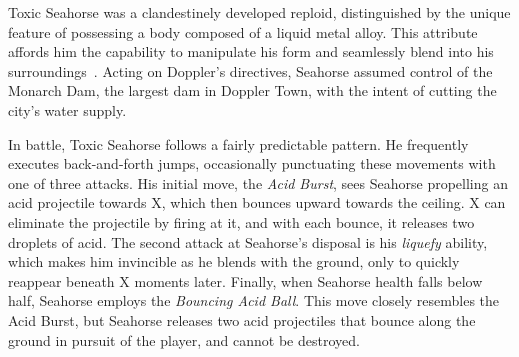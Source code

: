 Toxic Seahorse was a clandestinely developed reploid, distinguished by the unique feature of possessing a body composed of a liquid metal alloy. This attribute affords him the capability to manipulate his form and seamlessly blend into his surroundings~\cite{wiki:Toxic_seahorse,wayback:X3_resources}. Acting on Doppler's directives, Seahorse assumed control of the Monarch Dam, the largest dam in Doppler Town, with the intent of cutting the city's water supply.

In battle, Toxic Seahorse follows a fairly predictable pattern. He frequently executes back-and-forth jumps, occasionally punctuating these movements with one of three attacks. His initial move, the \emph{Acid Burst}, sees Seahorse propelling an acid projectile towards X, which then bounces upward towards the ceiling. X can eliminate the projectile by firing at it, and with each bounce, it releases two droplets of acid. The second attack at Seahorse's disposal is his \emph{liquefy} ability, which makes him invincible as he blends with the ground, only to quickly reappear beneath X moments later. Finally, when Seahorse health falls below half, Seahorse employs the \emph{Bouncing Acid Ball}. This move closely resembles the Acid Burst, but Seahorse releases two acid projectiles that bounce along the ground in pursuit of the player, and cannot be destroyed.

